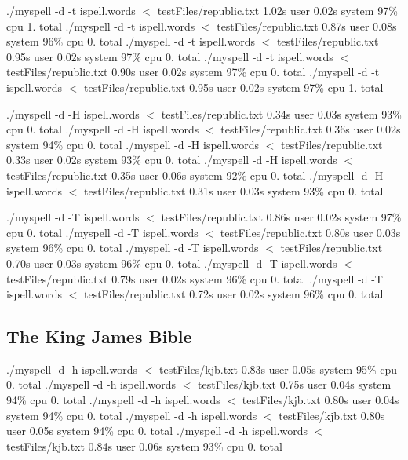 ./myspell -\/d -\/t ispell.\-words $<$ test\-Files/republic.\-txt 1.\-02s user 0.\-02s system 97\% cpu 1. total ./myspell -\/d -\/t ispell.\-words $<$ test\-Files/republic.\-txt 0.\-87s user 0.\-08s system 96\% cpu 0. total ./myspell -\/d -\/t ispell.\-words $<$ test\-Files/republic.\-txt 0.\-95s user 0.\-02s system 97\% cpu 0. total ./myspell -\/d -\/t ispell.\-words $<$ test\-Files/republic.\-txt 0.\-90s user 0.\-02s system 97\% cpu 0. total ./myspell -\/d -\/t ispell.\-words $<$ test\-Files/republic.\-txt 0.\-95s user 0.\-02s system 97\% cpu 1. total

./myspell -\/d -\/\-H ispell.\-words $<$ test\-Files/republic.\-txt 0.\-34s user 0.\-03s system 93\% cpu 0. total ./myspell -\/d -\/\-H ispell.\-words $<$ test\-Files/republic.\-txt 0.\-36s user 0.\-02s system 94\% cpu 0. total ./myspell -\/d -\/\-H ispell.\-words $<$ test\-Files/republic.\-txt 0.\-33s user 0.\-02s system 93\% cpu 0. total ./myspell -\/d -\/\-H ispell.\-words $<$ test\-Files/republic.\-txt 0.\-35s user 0.\-06s system 92\% cpu 0. total ./myspell -\/d -\/\-H ispell.\-words $<$ test\-Files/republic.\-txt 0.\-31s user 0.\-03s system 93\% cpu 0. total

./myspell -\/d -\/\-T ispell.\-words $<$ test\-Files/republic.\-txt 0.\-86s user 0.\-02s system 97\% cpu 0. total ./myspell -\/d -\/\-T ispell.\-words $<$ test\-Files/republic.\-txt 0.\-80s user 0.\-03s system 96\% cpu 0. total ./myspell -\/d -\/\-T ispell.\-words $<$ test\-Files/republic.\-txt 0.\-70s user 0.\-03s system 96\% cpu 0. total ./myspell -\/d -\/\-T ispell.\-words $<$ test\-Files/republic.\-txt 0.\-79s user 0.\-02s system 96\% cpu 0. total ./myspell -\/d -\/\-T ispell.\-words $<$ test\-Files/republic.\-txt 0.\-72s user 0.\-02s system 96\% cpu 0. total 

 \subsection*{The King James Bible }

./myspell -\/d -\/h ispell.\-words $<$ test\-Files/kjb.\-txt 0.\-83s user 0.\-05s system 95\% cpu 0. total ./myspell -\/d -\/h ispell.\-words $<$ test\-Files/kjb.\-txt 0.\-75s user 0.\-04s system 94\% cpu 0. total ./myspell -\/d -\/h ispell.\-words $<$ test\-Files/kjb.\-txt 0.\-80s user 0.\-04s system 94\% cpu 0. total ./myspell -\/d -\/h ispell.\-words $<$ test\-Files/kjb.\-txt 0.\-80s user 0.\-05s system 94\% cpu 0. total ./myspell -\/d -\/h ispell.\-words $<$ test\-Files/kjb.\-txt 0.\-84s user 0.\-06s system 93\% cpu 0. total

